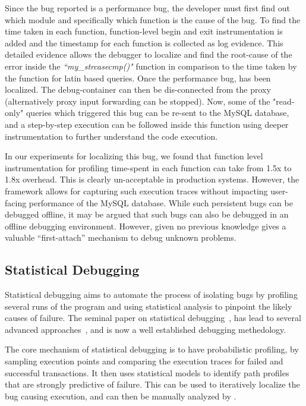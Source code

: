 Since the bug reported is a performance bug, the developer must first find out which module and specifically which function is the cause of the bug.
To find the time taken in each function, function-level begin and exit instrumentation is added and the timestamp for each function is collected as log evidence.
This detailed evidence allows the debugger to localize and find the root-cause of the error inside the \emph{``my\_strcasecmp()"} function in comparison to the time taken by the function for latin based queries.
Once the performance bug, has been localized.
The debug-container can then be dis-connected from the proxy (alternatively proxy input forwarding can be stopped).
Now, some of the "read-only" queries which triggered this bug can be re-sent to the MySQL database, and a step-by-step execution can be followed inside this function using deeper instrumentation to further understand the code execution.

In our experiments for localizing this bug, we found that function level instrumentation for profiling time-spent in each function can take from 1.5x to 1.8x overhead.
This is clearly un-acceptable in production systems.
However, the \parikshan framework allows for capturing such execution traces without impacting user-facing performance of the MySQL database.
While such persistent bugs can be debugged offline, it may be argued that such bugs can also be debugged in an offline debugging environment.
However, given no previous knowledge \parikshan gives a valuable ``first-attach'' mechanism to debug unknown problems.

\subsection{Statistical Debugging}
\label{sec:activeStatisticalDebugging}

Statistical debugging aims to automate the process of isolating bugs by profiling several runs of the program and using statistical analysis to pinpoint the likely causes of failure. 
The seminal paper on statistical debugging~\cite{statisticalDebugging}, has lead to several advanced approaches~\cite{holmes,adaptive,statisticalPerformance}, and is now a well established debugging methedology. 

The core mechanism of statistical debugging is to have probabilistic profiling, by sampling execution points and comparing the execution traces for failed and successful transactions.
It then uses statistical models to identify path profiles that are strongly predictive of failure. 
This can be used to iteratively localize the bug causing execution, and can then be manually analyzed by \parikshan.

